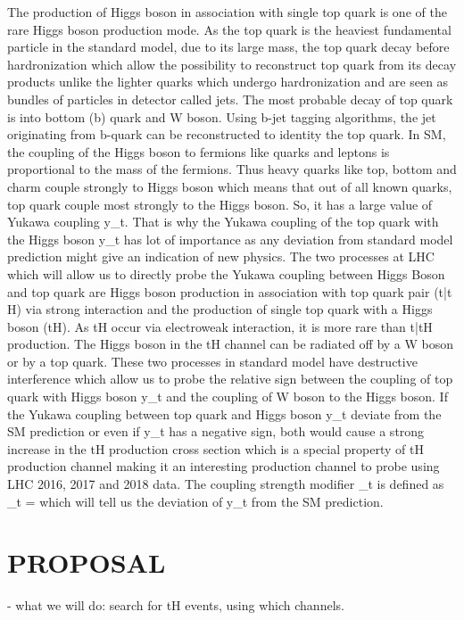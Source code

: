 \documentclass[final,3p]{CSP}
\begin{document}
The production of Higgs boson in association with single top quark is one of the rare Higgs boson production mode. As the top 
quark is the heaviest fundamental particle in the standard model, due to its large mass, the top quark decay before 
hardronization which allow the possibility to reconstruct top quark from its decay products unlike the lighter quarks which 
undergo hardronization and are seen as bundles of particles in detector called jets. The most probable decay of top quark is into 
bottom (b) quark and W boson. Using b-jet tagging algorithms, the jet originating from b-quark can be reconstructed to identity 
the top quark. In SM, the coupling of the Higgs boson to fermions like quarks and leptons is proportional to the mass of the 
fermions. Thus heavy quarks like top, bottom and charm couple strongly to Higgs boson which means that out of all known quarks, 
top quark couple most strongly to the Higgs boson. So, it has a large value of Yukawa coupling y_t. That is why the Yukawa 
coupling of the top quark with the Higgs boson y_t has lot of importance as any deviation from standard model prediction might 
give an indication of new physics. The two processes at LHC which will allow us to directly probe the Yukawa coupling between 
Higgs Boson and top quark are Higgs boson production in association with top quark pair (t\bar{t} H) via strong interaction and 
the production of single top quark with a Higgs boson (tH). As tH occur via electroweak interaction, it is more rare than 
t\bar{t}H production. The Higgs boson in the tH channel can be radiated off by a W boson or by a top quark. These two processes 
in standard model have destructive interference which allow us to probe the relative sign between the coupling of top quark with 
Higgs boson y_t and the coupling of W boson to the Higgs boson. If the Yukawa coupling between top quark and Higgs boson y_t 
deviate from the SM prediction or even if y_t has a negative sign, both would cause a strong increase in the tH production cross 
section which is a special property of tH production channel making it an interesting production channel to probe using LHC 
2016, 2017 and 2018 data. The coupling strength modifier \kappa_t is defined as \kappa_t =  which will tell us the 
deviation of y_t from the SM prediction.



\section{PROPOSAL}
- what we will do:  search for tH events, using which channels.
\end{document}
